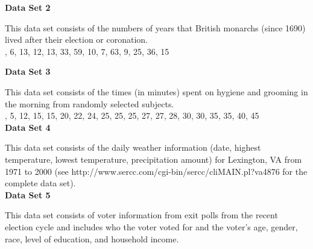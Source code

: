 \documentclass[fleqn, letterpaper]{article}
\begin{document}
\noindent
{\bfseries Data Set 2}


\noindent
This data set consists of the numbers of years that British monarchs (since 1690) lived after their election or coronation. \\


, 6, 13, 12, 13, 33, 59, 10, 7, 63, 9, 25, 36, 15

\noindent
{\bfseries Data Set 3}


\noindent
This data set consists of the times (in minutes) spent on hygiene and grooming in the morning from randomly selected subjects.\\


, 5, 12, 15, 15, 20, 22, 24, 25, 25, 25, 27, 27, 28, 30, 30, 35, 35, 40, 45\\

\noindent
{\bfseries Data Set 4}

\noindent
This data set consists of the daily weather information (date, highest temperature, lowest temperature, precipitation amount) for Lexington, VA from 1971 to 2000 (see http://www.sercc.com/cgi-bin/sercc/cliMAIN.pl?va4876 for the complete data set).\\

\noindent
{\bfseries Data Set 5}

\noindent
This data set consists of voter information from exit polls from the recent election cycle and includes who the voter voted for and the voter's age, gender, race, level of education, and household income.
\end{document}

